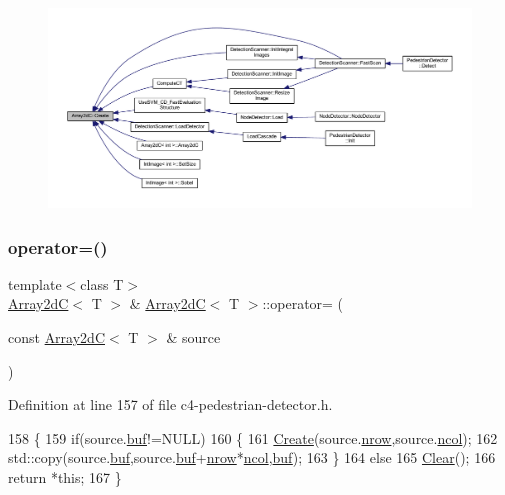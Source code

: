 \begin{figure}[H]
\begin{center}
\leavevmode
\includegraphics[width=350pt]{class_array2d_c_abfe87be7641dfc586b9e7bffebcca9ec_icgraph}
\end{center}
\end{figure}
\mbox{\label{class_array2d_c_a241cc9224f991e0496dad95bc396e84e}} 
\subsubsection{\texorpdfstring{operator=()}{operator=()}}
{\footnotesize\ttfamily template$<$class T$>$ \\
\mbox{\hyperlink{class_array2d_c}{Array2dC}}$<$ T $>$ \& \mbox{\hyperlink{class_array2d_c}{Array2dC}}$<$ T $>$\+::operator= (\begin{DoxyParamCaption}\item[{const \mbox{\hyperlink{class_array2d_c}{Array2dC}}$<$ T $>$ \&}]{source }\end{DoxyParamCaption})}



Definition at line 157 of file c4-\/pedestrian-\/detector.\+h.


\begin{DoxyCode}
158 \{
159     \textcolor{keywordflow}{if}(source.\mbox{\hyperlink{class_array2d_c_a25d8fa5049d4c7ded126e0acdd18f37a}{buf}}!=NULL)
160     \{
161         \mbox{\hyperlink{class_array2d_c_abfe87be7641dfc586b9e7bffebcca9ec}{Create}}(source.\mbox{\hyperlink{class_array2d_c_a12f690f7195f7674a86a7e1eedbc473c}{nrow}},source.\mbox{\hyperlink{class_array2d_c_a27e0f8f40f644831cd7c750db59dc28a}{ncol}});
162         std::copy(source.\mbox{\hyperlink{class_array2d_c_a25d8fa5049d4c7ded126e0acdd18f37a}{buf}},source.\mbox{\hyperlink{class_array2d_c_a25d8fa5049d4c7ded126e0acdd18f37a}{buf}}+\mbox{\hyperlink{class_array2d_c_a12f690f7195f7674a86a7e1eedbc473c}{nrow}}*\mbox{\hyperlink{class_array2d_c_a27e0f8f40f644831cd7c750db59dc28a}{ncol}},\mbox{\hyperlink{class_array2d_c_a25d8fa5049d4c7ded126e0acdd18f37a}{buf}});
163     \}
164     \textcolor{keywordflow}{else}
165         \mbox{\hyperlink{class_array2d_c_a76a406cfeb9a9f75a1586e0a7b22f63e}{Clear}}();
166     \textcolor{keywordflow}{return} *\textcolor{keyword}{this};
167 \}
\end{DoxyCode}
\mbox{\label{class_array2d_c_ae8cbeb3e4fdc3a45cc188ecc1b317919}} 
